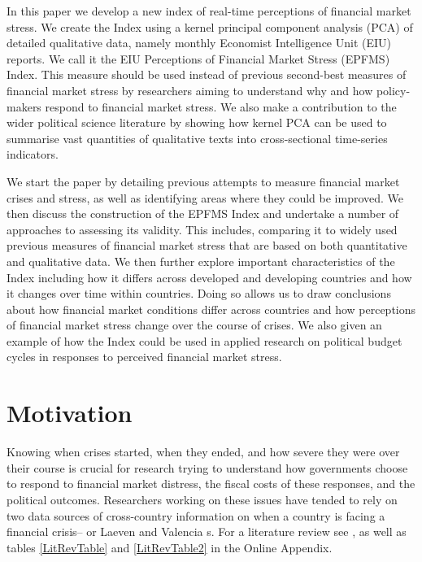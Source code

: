 \documentclass[]{article}
\begin{document}
In this paper we develop a new index of real-time perceptions of financial market stress. We create the Index using a kernel principal component analysis (PCA) of detailed qualitative data, namely monthly Economist Intelligence Unit (EIU) reports. We call it the EIU Perceptions of Financial Market Stress (EPFMS) Index. This measure should be used instead of previous second-best measures of financial market stress by researchers aiming to understand why and how policy-makers respond to financial market stress. We also make a contribution to the wider political science literature by showing how kernel PCA can be used to summarise vast quantities of qualitative texts into cross-sectional time-series indicators.

We start the paper by detailing previous attempts to measure financial market crises and stress, as well as identifying areas where they could be improved. We then discuss the construction of the EPFMS Index and undertake a number of approaches to assessing its validity. This includes, comparing it to widely used previous measures of financial market stress that are based on both quantitative and qualitative data. We then further explore important characteristics of the Index including how it differs across developed and developing countries and how it changes over time within countries. Doing so allows us to draw conclusions about how financial market conditions differ across countries and how perceptions of financial market stress change over the course of crises. We also given an example of how the Index could be used in applied research on political budget cycles in responses to perceived financial market stress.

\section{Motivation}\label{motivation}

Knowing when crises started, when they ended, and how severe they were over their course is crucial for research trying to understand how governments choose to respond to financial market distress, the fiscal costs of these responses, and the political outcomes. Researchers working on these issues have tended to rely on two data sources of cross-country information on when a country is facing a financial crisis--\cite{Reinhart2009,ReinhartRog2010} or Laeven and Valencia \citeyearpar[and their predecessors]{laeven2013}s. For a literature review see \cite{GandrudHallerberg2015}, as well as tables \ref{LitRevTable} and \ref{LitRevTable2} in the Online Appendix.
\end{document}
